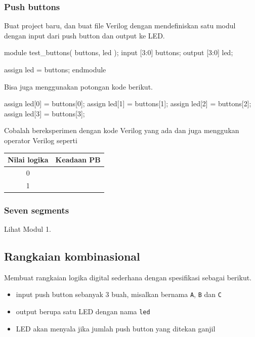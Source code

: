 \documentclass[a4paper,12pt,bahasa]{extarticle}
\begin{document}
\subsubsection{Push buttons}

Buat project baru, dan buat file Verilog dengan mendefiniskan satu modul
dengan input dari push button dan output ke LED.
\begin{verilogcode}
module test_buttons( buttons, led );
  input  [3:0] buttons;
  output [3:0] led;

  assign led = buttons;
endmodule
\end{verilogcode}

Bisa juga menggunakan potongan kode berikut.
\begin{verilogcode}
  assign led[0] = buttons[0];
  assign led[1] = buttons[1];
  assign led[2] = buttons[2];
  assign led[3] = buttons[3];
\end{verilogcode}

Cobalah bereksperimen dengan kode Verilog yang ada dan juga menggukan operator Verilog
seperti 

\begin{table}[H]
\centering
\begin{tabular}{|c|c|}
\hline
Nilai logika & Keadaan PB \\
\hline
0 & \\
1 & \\
\hline
\end{tabular}
\par
\end{table}

\subsubsection{Seven segments}

Lihat Modul 1.



\subsection{Rangkaian kombinasional}

Membuat rangkaian logika digital sederhana dengan spesifikasi sebagai berikut.

\begin{itemize}
\item input push button sebanyak 3 buah, misalkan bernama {\tt A}, {\tt B}
dan {\tt C}
\item output berupa satu LED dengan nama {\tt led}
\item LED akan menyala jika jumlah push button
yang ditekan ganjil
\end{itemize}
\end{document}
